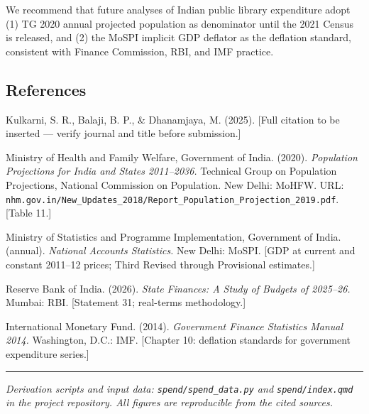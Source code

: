 \documentclass[
  11pt,
  oneside,
  10pt,
  a4paper,
  twocolumn]{article}
\begin{document}
We recommend that future analyses of Indian public library expenditure
adopt (1) TG 2020 annual projected population as denominator until the
2021 Census is released, and (2) the MoSPI implicit GDP deflator as the
deflation standard, consistent with Finance Commission, RBI, and IMF
practice.

\subsection{References}\label{references}

Kulkarni, S. R., Balaji, B. P., \& Dhanamjaya, M. (2025). {[}Full
citation to be inserted --- verify journal and title before
submission.{]}

Ministry of Health and Family Welfare, Government of India. (2020).
\emph{Population Projections for India and States 2011--2036.} Technical
Group on Population Projections, National Commission on Population. New
Delhi: MoHFW. URL:
\texttt{nhm.gov.in/New\_Updates\_2018/Report\_Population\_Projection\_2019.pdf}.
{[}Table 11.{]}

Ministry of Statistics and Programme Implementation, Government of
India. (annual). \emph{National Accounts Statistics.} New Delhi: MoSPI.
{[}GDP at current and constant 2011--12 prices; Third Revised through
Provisional estimates.{]}

Reserve Bank of India. (2026). \emph{State Finances: A Study of Budgets
of 2025--26.} Mumbai: RBI. {[}Statement 31; real-terms methodology.{]}

International Monetary Fund. (2014). \emph{Government Finance Statistics
Manual 2014.} Washington, D.C.: IMF. {[}Chapter 10: deflation standards
for government expenditure series.{]}

\begin{center}\rule{0.5\linewidth}{0.5pt}\end{center}

\emph{Derivation scripts and input data: \texttt{spend/spend\_data.py}
and \texttt{spend/index.qmd} in the project repository. All figures are
reproducible from the cited sources.}
\end{document}
